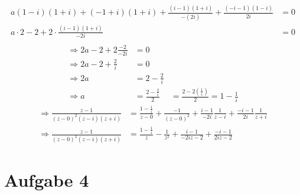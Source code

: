 \documentclass[11pt,a4paper]{article}
\begin{document}
\begin{enumerate}[a)]
\begin{align*}
        a(1-i)(1+i)+(-1+i)(1+i)+\frac{(i-1)(1+i)}{-(2i)}+\frac{(-i-1)(1-i)}{2i}&=0\\
        a\cdot2-2+2\cdot\frac{(i-1)(1+i)}{-2i}&=0\\
    \end{align*}
    \begin{align*}
        \Rightarrow 2a-2+2\frac{-2}{-2i}&=0\\
        \Rightarrow 2a-2+\frac{2}{i}&=0\\
        \Rightarrow 2a&=2-\frac{2}{i}\\
        \Rightarrow a&=\frac{2-\frac{2}{i}}{2}&=\frac{2-2\left(\frac{1}{i}\right)}{2}=1-\frac{1}{i}
    \end{align*}
    \begin{align*}
      \Rightarrow \frac{z-1}{\left(z-0\right)^2\left(z-i\right)(z+i)}&=\frac{1-\frac{1}{i}}{z-0}+\frac{-1}{(z-0)^2}+\frac{i-1}{-2i}\frac{1}{z-i}+\frac{-i-1}{2i}\frac{1}{z+i}\\
      \Rightarrow \frac{z-1}{(z-0)^2(z-i)(z+i)}&=\frac{1-\frac{1}{i}}{z}-\frac{1}{z^2}+\frac{i-1}{-2iz-2}+\frac{-i-1}{2iz-2}
    \end{align*}
    \end{enumerate}

  \section*{Aufgabe 4}
\end{document}
